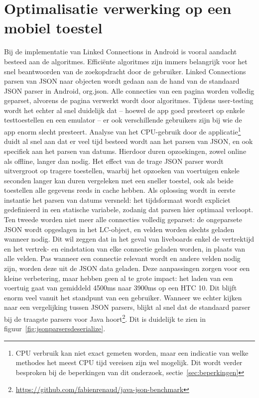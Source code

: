 \section{Optimalisatie verwerking op een mobiel toestel}
Bij de implementatie van Linked Connections in Android is vooral aandacht besteed aan de algoritmes. Efficiënte algoritmes zijn immers belangrijk voor het snel beantwoorden van de zoekopdracht door de gebruiker. Linked Connections parsen van JSON naar objecten wordt gedaan aan de hand van de standaard JSON parser in Android, org.json. Alle connecties van een pagina worden volledig geparset, alvorens de pagina verwerkt wordt door algoritmes. 
Tijdens user-testing wordt het echter al snel duidelijk dat -- hoewel de app goed presteert op enkele testtoestellen en een emulator -- er ook verschillende gebruikers zijn bij wie de app enorm slecht presteert. Analyse van het CPU-gebruik door de applicatie\footnote{CPU verbruik kan niet exact gemeten worden, maar een indicatie van welke methodes het meest CPU tijd vereisen zijn wel mogelijk. Dit wordt verder besproken bij de beperkingen van dit onderzoek, sectie~\ref{sec:beperkingen}} duidt al snel aan dat er veel tijd besteed wordt aan het parsen van JSON, en ook specifiek aan het parsen van datums. Hierdoor duren opzoekingen, zowel online als offline, langer dan nodig. Het effect van de trage JSON parser wordt uitvergroot op tragere toestellen, waarbij het opzoeken van voertuigen enkele seconden langer kan duren vergeleken met een sneller toestel, ook als beide toestellen alle gegevens reeds in cache hebben.
Als oplossing wordt in eerste instantie het parsen van datums versneld: het tijdsformaat wordt expliciet gedefinieerd in een statische variabele, zodanig dat parsen hier optimaal verloopt. Ten tweede worden niet meer alle connecties volledig geparset: de ongeparsete JSON wordt opgeslagen in het LC-object, en velden worden slechts geladen wanneer nodig. Dit wil zeggen dat in het geval van liveboards enkel de vertrektijd en het vertrek- en eindstation van elke connectie geladen worden, in plaats van alle velden. Pas wanneer een connectie relevant wordt en andere velden nodig zijn, worden deze uit de JSON data geladen.
Deze aanpassingen zorgen voor een kleine verbetering, maar hebben geen al te grote impact: het laden van een voertuig gaat van gemiddeld 4500ms naar 3900ms op een HTC 10. Dit blijft enorm veel vanuit het standpunt van een gebruiker.
Wanneer we echter kijken naar een vergelijking tussen JSON parsers, blijkt al snel dat de standaard  parser bij de traagste parsers voor Java hoort\footnote{\url{https://github.com/fabienrenaud/java-json-benchmark}}. Dit is duidelijk te zien in figuur~\ref{fig:jsonparsersdeserialize}.

